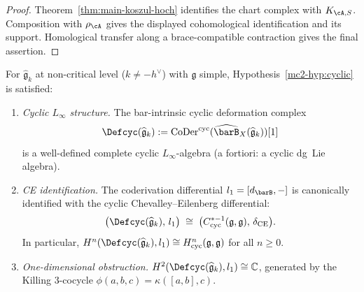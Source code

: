 \begin{proof}
Theorem~\ref{thm:main-koszul-hoch} identifies the chart complex with
\(K_{\cA,S}\).  Composition with \(\rho_\cA\) gives the displayed
cohomological identification and its support.  Homological transfer
along a brace-compatible contraction gives the final assertion.
\end{proof}

\begin{theorem}\label{thm:mc2-1-km}
For $\widehat{\mathfrak{g}}_k$ at non-critical level ($k \neq -h^\vee$)
with $\mathfrak{g}$ simple, Hypothesis~\textup{\ref{mc2-hyp:cyclic}}
is satisfied:
\begin{enumerate}[label=\textup{(\roman*)}]
\item \emph{Cyclic $L_\infty$ structure.}
 The bar-intrinsic cyclic deformation complex
 \[
 \Defcyc(\widehat{\mathfrak{g}}_k)
 := \operatorname{CoDer}^{\mathrm{cyc}}(\widehat{\barB}_X
 (\widehat{\mathfrak{g}}_k))[1]
 \]
 is a well-defined complete cyclic $L_\infty$-algebra
 \textup{(}a fortiori: a cyclic dg~Lie algebra\textup{)}.

\item \emph{CE identification.}
 The coderivation differential $l_1 = [d_{\barB},-]$ is canonically
 identified with the cyclic Chevalley--Eilenberg differential:
 \begin{equation}\label{eq:coder-ce-ident}
 \bigl(\Defcyc(\widehat{\mathfrak{g}}_k),\, l_1\bigr)
 \;\cong\;
 \bigl(C^{*-1}_{\mathrm{cyc}}(\mathfrak{g},\mathfrak{g}),\,
 \delta_{\mathrm{CE}}\bigr).
 \end{equation}
 In particular,
 $H^n(\Defcyc(\widehat{\mathfrak{g}}_k), l_1) \cong
 H^n_{\mathrm{cyc}}(\mathfrak{g},\mathfrak{g})$
 for all $n \geq 0$.

\item \emph{One-dimensional obstruction.}
 $H^2(\Defcyc(\widehat{\mathfrak{g}}_k), l_1) \cong \mathbb{C}$,
 generated by the Killing $3$-cocycle
 $\phi(a,b,c) = \kappa([a,b],c)$.
\end{enumerate}
\end{theorem}

